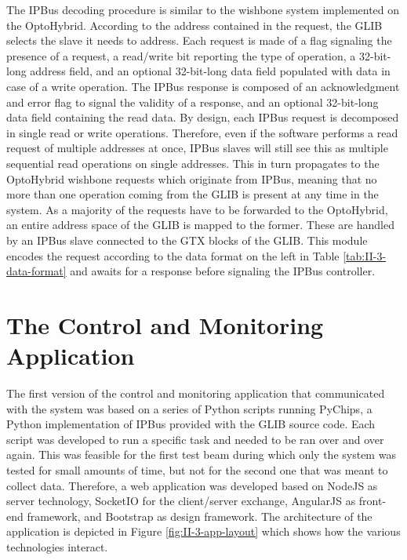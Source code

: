       The IPBus decoding procedure is similar to the wishbone system implemented on the OptoHybrid. According to the address contained in the request, the GLIB selects the slave it needs to address. Each request is made of a flag signaling the presence of a request, a read/write bit reporting the type of operation, a 32-bit-long address field, and an optional 32-bit-long data field populated with data in case of a write operation. The IPBus response is composed of an acknowledgment and error flag to signal the validity of a response, and an optional 32-bit-long data field containing the read data. By design, each IPBus request is decomposed in single read or write operations. Therefore, even if the software performs a read request of multiple addresses at once, IPBus slaves will still see this as multiple sequential read operations on single addresses. This in turn propagates to the OptoHybrid wishbone requests which originate from IPBus, meaning that no more than one operation coming from the GLIB is present at any time in the system. As a majority of the requests have to be forwarded to the OptoHybrid, an entire address space of the GLIB is mapped to the former. These are handled by an IPBus slave connected to the GTX blocks of the GLIB. This module encodes the request according to the data format on the left in Table \ref{tab:II-3-data-format} and awaits for a response before signaling the IPBus controller.

  \section{The Control and Monitoring Application}

    The first version of the control and monitoring application that communicated with the system was based on a series of Python scripts running PyChips, a Python implementation of IPBus provided with the GLIB source code. Each script was developed to run a specific task and needed to be ran over and over again. This was feasible for the first test beam during which only the system was tested for small amounts of time, but not for the second one that was meant to collect data. Therefore, a web application was developed based on NodeJS \cite{NODEJS} as server technology, SocketIO \cite{SOCKETIO} for the client/server exchange, AngularJS \cite{ANGULARJS} as front-end framework, and Bootstrap \cite{BOOTSTRAP} as design framework. The architecture of the application is depicted in Figure \ref{fig:II-3-app-layout} which shows how the various technologies interact.

